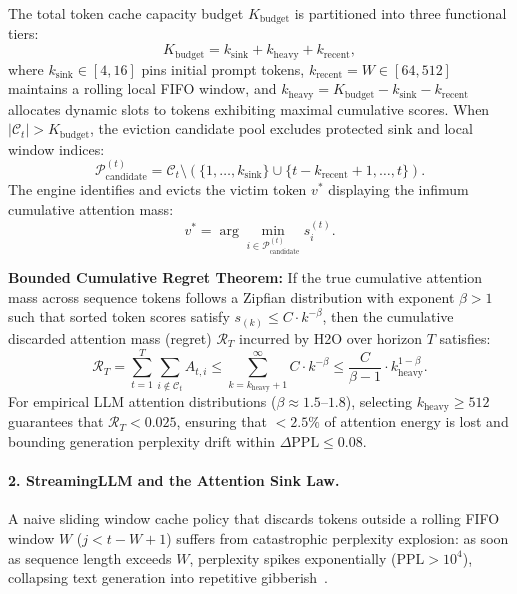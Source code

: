 The total token cache capacity budget $K_{\text{budget}}$ is partitioned into three functional tiers:
\begin{equation}
\label{eq:h2o_budget_split}
K_{\text{budget}} = k_{\text{sink}} + k_{\text{heavy}} + k_{\text{recent}},
\end{equation}
where $k_{\text{sink}} \in [4, 16]$ pins initial prompt tokens, $k_{\text{recent}} = W \in [64, 512]$ maintains a rolling local FIFO window, and $k_{\text{heavy}} = K_{\text{budget}} - k_{\text{sink}} - k_{\text{recent}}$ allocates dynamic slots to tokens exhibiting maximal cumulative scores. When $|\mathcal{C}_t| > K_{\text{budget}}$, the eviction candidate pool excludes protected sink and local window indices:
\begin{equation}
\label{eq:h2o_candidate_set}
\mathcal{P}_{\text{candidate}}^{(t)} = \mathcal{C}_t \setminus \left( \{1, \dots, k_{\text{sink}}\} \cup \{t - k_{\text{recent}} + 1, \dots, t\} \right).
\end{equation}
The engine identifies and evicts the victim token $v^*$ displaying the infimum cumulative attention mass:
\begin{equation}
\label{eq:h2o_argmin_victim}
v^* = \arg\min_{i \in \mathcal{P}_{\text{candidate}}^{(t)}} s_i^{(t)}.
\end{equation}

\noindent\textbf{Bounded Cumulative Regret Theorem:} If the true cumulative attention mass across sequence tokens follows a Zipfian distribution with exponent $\beta > 1$ such that sorted token scores satisfy $s_{(k)} \le C \cdot k^{-\beta}$, then the cumulative discarded attention mass (regret) $\mathcal{R}_T$ incurred by \textsc{H2O} over horizon $T$ satisfies:
\begin{equation}
\label{eq:h2o_regret_theorem}
\mathcal{R}_T = \sum_{t=1}^T \sum_{i \notin \mathcal{C}_t} A_{t, i} \le \sum_{k = k_{\text{heavy}} + 1}^\infty C \cdot k^{-\beta} \le \frac{C}{\beta - 1} \cdot k_{\text{heavy}}^{1 - \beta}.
\end{equation}
For empirical LLM attention distributions ($\beta \approx 1.5\text{--}1.8$), selecting $k_{\text{heavy}} \ge 512$ guarantees that $\mathcal{R}_T < 0.025$, ensuring that $<2.5\%$ of attention energy is lost and bounding generation perplexity drift within $\Delta\text{PPL} \le 0.08$.

\paragraph{2. StreamingLLM and the Attention Sink Law.}
A naive sliding window cache policy that discards tokens outside a rolling FIFO window $W$ ($j < t - W + 1$) suffers from catastrophic perplexity explosion: as soon as sequence length exceeds $W$, perplexity spikes exponentially ($\text{PPL} > 10^4$), collapsing text generation into repetitive gibberish~\cite{xiao2024streamingllm}. 

